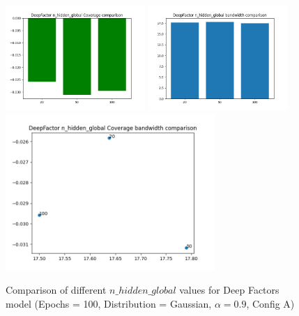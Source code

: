 \documentclass[a4paper, 12pt]{article}
\begin{document}
\begin{figure}[!h]
    \centering
    \includegraphics[width=200px]{plots/hist/a/DeepFactor/n_hidden_global/Coverage.png}
    \includegraphics[width=200px]{plots/hist/a/DeepFactor/n_hidden_global/bandwidth.png}
    \includegraphics[width=300px]{plots/scatter/a/DeepFactor/n_hidden_global/Coverage_bandwidth.png}
    \caption{Comparison of different $n\_hidden\_global$ values for Deep Factors model (Epochs = 100, Distribution = Gaussian, $\alpha = 0.9$, Config A)}
    \label{fig:comp_deepfactor_n_hidden_globals}
\end{figure}
\end{document}
